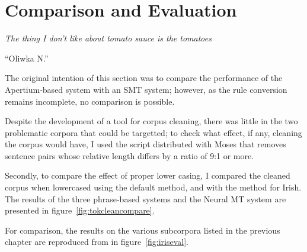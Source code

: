 \chapter{Comparison and Evaluation}
\label{chap:compare}
\epigraph{\textit{\small{The thing I don't like about tomato sauce is the tomatoes}}}{``Oliwka N.''}

The original intention of this section was to compare the performance of the Apertium-based system
with an SMT system; however, as the rule conversion remains incomplete, no comparison is possible.

Despite the development of a tool for corpus cleaning, there was little in the two problematic
corpora that could be targetted; to check what effect, if any, cleaning the corpus would have,
I used the script distributed with Moses that removes sentence pairs whose relative length
differs by a ratio of 9:1 or more.

Secondly, to compare the effect of proper lower casing, I compared the cleaned corpus when lowercased
using the default method, and with the method for Irish. The results of the three phrase-based systems
and the Neural MT system are presented in figure~\ref{fig:tokcleancompare}.

For comparison, the results on the various subcorpora listed in the previous chapter are reproduced
from \citet[p. 569]{ARCAN16.9} in figure~\ref{fig:iriseval}.

